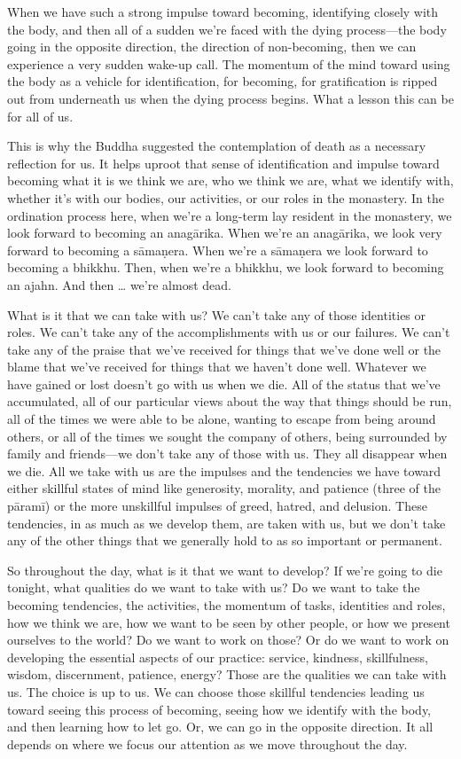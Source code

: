 When we have such a strong impulse toward becoming, identifying closely 
with the body, and then all of a sudden we're faced with the dying 
process---the body going in the opposite direction, the direction of 
non-becoming, then we can experience a very sudden wake-up call. The 
momentum of the mind toward using the body as a vehicle for 
identification, for becoming, for gratification is ripped out from 
underneath us when the dying process begins. What a lesson this can be 
for all of us.

This is why the Buddha suggested the contemplation of death as a 
necessary reflection for us. It helps uproot that sense of 
identification and impulse toward becoming what it is we think we are, 
who we think we are, what we identify with, whether it's with our 
bodies, our activities, or our roles in the monastery. In the 
ordination process here, when we're a long-term lay resident in the 
monastery, we look forward to becoming an anagārika. When we're an 
anagārika, we look very forward to becoming a sāmaṇera. When we're 
a sāmaṇera we look forward to becoming a bhikkhu. Then, when we're a 
bhikkhu, we look forward to becoming an ajahn. And then \ldots{} we're 
almost dead.

What is it that we can take with us? We can't take any of those 
identities or roles. We can't take any of the accomplishments with us 
or our failures. We can't take any of the praise that we've received 
for things that we've done well or the blame that we've received for 
things that we haven't done well. Whatever we have gained or lost 
doesn't go with us when we die. All of the status that we've 
accumulated, all of our particular views about the way that things 
should be run, all of the times we were able to be alone, wanting to 
escape from being around others, or all of the times we sought the 
company of others, being surrounded by family and friends---we don't 
take any of those with us. They all disappear when we die. All we take 
with us are the impulses and the tendencies we have toward either 
skillful states of mind like generosity, morality, and patience (three 
of the pāramī) or the more unskillful impulses of greed, hatred, and 
delusion. These tendencies, in as much as we develop them, are taken 
with us, but we don't take any of the other things that we generally 
hold to as so important or permanent.

So throughout the day, what is it that we want to develop? If we're 
going to die tonight, what qualities do we want to take with us? Do we 
want to take the becoming tendencies, the activities, the momentum of 
tasks, identities and roles, how we think we are, how we want to be 
seen by other people, or how we present ourselves to the world? Do we 
want to work on those? Or do we want to work on developing the 
essential aspects of our practice: service, kindness, skillfulness, 
wisdom, discernment, patience, energy? Those are the qualities we can 
take with us. The choice is up to us. We can choose those skillful 
tendencies leading us toward seeing this process of becoming, seeing 
how we identify with the body, and then learning how to let go. Or, we 
can go in the opposite direction. It all depends on where we focus our 
attention as we move throughout the day.

